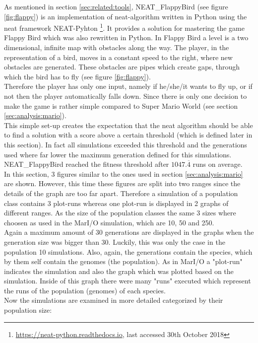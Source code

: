 		As mentioned in section \ref{sec:related:tools}, NEAT\_FlappyBird (see figure \ref{fig:flappy}) is an implementation of \gls{neat}-algorithm written in Python using the \gls{neat} framework NEAT-Pyhton \footnote{\url{https://neat-python.readthedocs.io}, last accessed 30th October 2018}. It provides a solution for mastering the game Flappy Bird which was also rewritten in Python. In Flappy Bird a level is a two dimensional, infinite map with obstacles along the way. The player, in the representation of a bird, moves in a constant speed to the right, where new obstacles are generated. These obstacles are pipes which create gaps, through which the bird has to fly (see figure \ref{fig:flappy}). \\
		Therefore the player has only one input, namely if he/she/it wants to fly up, or if not then the player automatically falls down. Since there is only one decision to make the game is rather simple compared to Super Mario World (see section \ref{sec:analysis:mario}).\\
		This simple set-up creates the expectation that the \gls{neat} algorithm should be able to find a solution with a score above a certain threshold (which is defined later in this section). In fact all simulations exceeded this threshold and the generations used where far lower the maximum generation defined for this simulations. NEAT\_FlappyBird reached the fitness threshold after $1047.\overline{4}$ runs on average. \\
		In this section, 3 figures similar to the ones used in section \ref{sec:analysis:mario} are shown. However, this time these figures are split into two ranges since the details of the graph are too far apart. Therefore a simulation of a population class contains 3 plot-runs whereas one plot-run is displayed in 2 graphs of different ranges.  As the size of the population classes the same 3 sizes where choosen as used in the MarI/O simulation, which are 10, 50 and 250. \\
		Again a maximum amount of 30 generations are displayed in the graphs when the generation size was bigger than 30. Luckily, this was only the case in the population 10 simulations. Also, again, the generations contain the species, which by them self contain the genomes (the population). 
		As in MarI/O a "plot-run" indicates the simulation and also the graph which was plotted based on the simulation. Inside of this graph there were many "runs" executed which represent the runs of the population (genomes) of each species. \\
		Now the simulations are examined in more detailed categorized by their population size:
		
